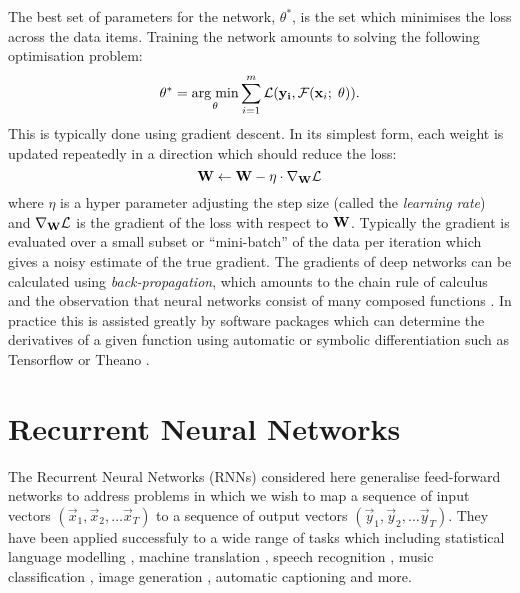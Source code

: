 The best set of parameters for the network, \(\theta^*\), is the set which minimises the
loss across the data items. Training the network amounts to solving the following
optimisation problem:
\begin{equation}\label{eq:nnoptimise}
	\theta^* = 
	\operatorname*{arg\;min}_{\theta} \sum_{i=1}^m \mathcal{L}(\mathbf{y_i}, \mathcal{F}(\mathbf{x}_i;\; \theta)).
\end{equation}
This is typically done using gradient descent. In its simplest
form, each weight is updated repeatedly in a direction which should reduce the loss:
\begin{equation} \label{eq:graddescent}
	\mathbf{W} \gets \mathbf{W} - \eta \cdot \nabla_{\mathbf{W}}\mathcal{L}
\end{equation} where \(\eta\) is a hyper parameter adjusting the step size (called the
\emph{learning rate}) and \(\nabla_{\mathbf{W}}\mathcal{L}\) is the gradient of the loss with respect
to \(\mathbf{W}\). Typically the gradient is evaluated over a small subset or ``mini-batch''
 of the data per iteration which gives a noisy estimate of the true gradient.
The gradients of deep networks can be calculated using \emph{back-propagation}, which amounts
to the chain rule of calculus and the observation that neural networks consist of many
composed functions \autocite{Rumelhart1986}. In practice this is assisted greatly by software
packages which can determine the derivatives of a given function using automatic or symbolic
differentiation such as Tensorflow \autocite{Abadi2015} or Theano
 \autocite{TheTheanoDevelopmentTeam2016}.

\section{Recurrent Neural Networks}
The Recurrent Neural Networks (RNNs) considered here generalise feed-forward networks to
address problems in which we wish to map a sequence of input vectors
\((\vec{x}_1, \vec{x}_2, \dots \vec{x}_T) \) to a sequence of output vectors
\((\vec{y}_1, \vec{y}_2, \dots \vec{y}_T) \). They have been applied successfuly to a
wide range of tasks which including statistical language modelling
\autocite{Mikolov2012}, machine translation \autocite{Cho2014, Wu2016a}, speech 
recognition \autocite{Graves2006}, music classification \autocite{Choi2016},
image generation \autocite{Gregor2015}, automatic captioning \autocite{Vinyals2016, Xu2015}  and more.

